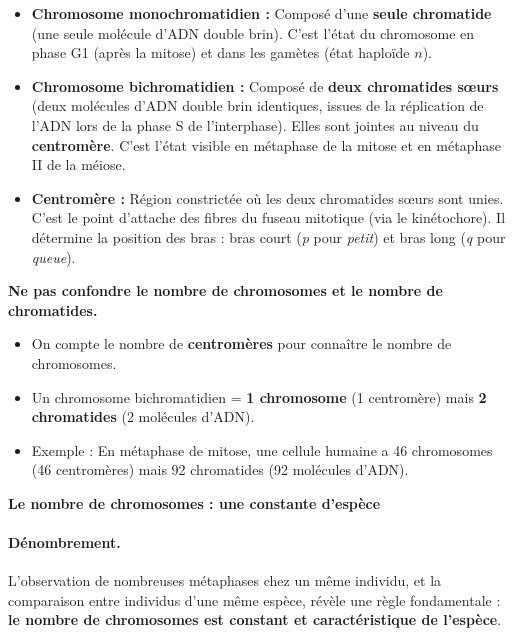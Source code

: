 \documentclass[11pt]{article}
\begin{document}
\begin{propriete}
\begin{itemize}
    \item \textbf{Chromosome monochromatidien :} Composé d'une \textbf{seule chromatide} (une seule molécule d'ADN double brin). C'est l'état du chromosome en phase G1 (après la mitose) et dans les gamètes (état haploïde $n$).
    \item \textbf{Chromosome bichromatidien :} Composé de \textbf{deux chromatides sœurs} (deux molécules d'ADN double brin identiques, issues de la réplication de l'ADN lors de la phase S de l'interphase). Elles sont jointes au niveau du \textbf{centromère}. C'est l'état visible en métaphase de la mitose et en métaphase II de la méiose.
    \item \textbf{Centromère :} Région constrictée où les deux chromatides sœurs sont unies. C'est le point d'attache des fibres du fuseau mitotique (via le kinétochore). Il détermine la position des bras : bras court (\emph{p} pour \emph{petit}) et bras long (\emph{q} pour \emph{queue}).
\end{itemize}
\end{propriete}

\begin{attention}
\textbf{Ne pas confondre le nombre de chromosomes et le nombre de chromatides.}
\begin{itemize}
    \item On compte le nombre de \textbf{centromères} pour connaître le nombre de chromosomes.
    \item Un chromosome bichromatidien = \textbf{1 chromosome} (1 centromère) mais \textbf{2 chromatides} (2 molécules d'ADN).
    \item Exemple : En métaphase de mitose, une cellule humaine a 46 chromosomes (46 centromères) mais 92 chromatides (92 molécules d'ADN).
\end{itemize}
\end{attention}

\textbf{Le nombre de chromosomes : une constante d'espèce}\par

\paragraph{Dénombrement.} L'observation de nombreuses métaphases chez un même individu, et la comparaison entre individus d'une même espèce, révèle une règle fondamentale : \textbf{le nombre de chromosomes est constant et caractéristique de l'espèce}.
\end{document}
